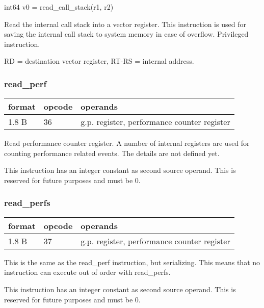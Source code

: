 \documentclass[forwardcom.tex]{subfiles}
\begin{document}
int64 v0 = read\_call\_stack(r1, r2)
\vspace{2mm}

Read the internal call stack into a vector register. This instruction is used for saving the internal call stack to system memory in case of overflow.
Privileged instruction.
\vspace{2mm}

RD = destination vector register, RT-RS = internal address.


\subsubsection{read\_perf}
\label{table:readPerfInstruction}
\begin{tabular}{|p{12mm}|p{12mm}|p{110mm}|}
\hline
\bfseries format & \bfseries opcode & \bfseries operands \\ \hline
1.8 B & 36 & g.p. register, performance counter register \\ \hline
\end{tabular}
\vspace{2mm}

Read performance counter register. A number of internal registers are used for counting performance related events. The details are not defined yet.
\vspace{2mm}

This instruction has an integer constant as second source operand. This is reserved for future purposes and must be 0.


\subsubsection{read\_perfs}
\label{table:readPerfInstruction}
\begin{tabular}{|p{12mm}|p{12mm}|p{110mm}|}
\hline
\bfseries format & \bfseries opcode & \bfseries operands \\ \hline
1.8 B & 37 & g.p. register, performance counter register \\ \hline
\end{tabular}
\vspace{2mm}

This is the same as the read\_perf instruction, but serializing. This means that no instruction can execute out of order with read\_perfs.

\vspace{2mm}

This instruction has an integer constant as second source operand. This is reserved for future purposes and must be 0.
\end{document}
